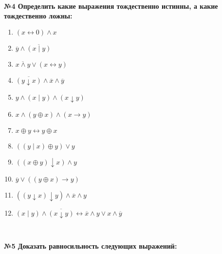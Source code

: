     \begin{center}
        \textbf{№4 Определить какие выражения тождественно истинны, а какие тождественно ложны:}
    \end{center}

    \begin{minipage}[t]{0.5\textwidth}
        \begin{enumerate}
            \item $(x \leftrightarrow 0) \wedge x$
            \item $\overline y \wedge \overline{(x \mid y)}$
            \item $\overline{x \wedge y} \vee (x \leftrightarrow y)$
            \item $\overline{(y \downarrow x)} \wedge \overline x \wedge \overline y$
            \item $y \wedge (x \mid y) \wedge (x \downarrow y)$
            \item $x \wedge (y \oplus x) \wedge (x \rightarrow y)$

        \end{enumerate}
    \end{minipage}
    \begin{minipage}[t]{0.5\textwidth}
        \begin{enumerate}
            \setcounter{enumi}{6}
            \item $x \oplus y \leftrightarrow y \oplus x$
            \item $((y \mid x) \oplus y) \vee y$
            \item $((x \oplus y) \downarrow x) \wedge y$
            \item $\overline y \vee ((y \oplus x) \rightarrow y)$
            \item $((y \downarrow x) \downarrow y) \wedge \overline x \wedge y$
            \item $(x \mid y) \wedge \overline{(x \downarrow y)} \leftrightarrow \overline x \wedge y \vee x \wedge \overline y$
        \end{enumerate}
    \end{minipage}\

    \begin{center}
        \textbf{№5 Доказать равносильность следующих выражений:}
    \end{center}

